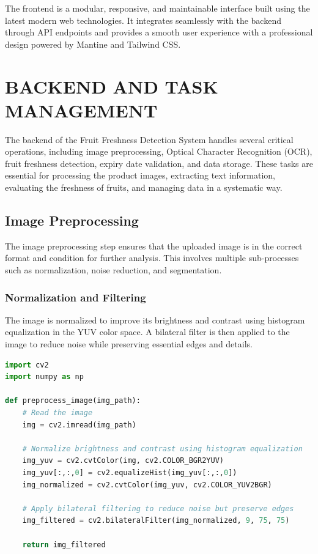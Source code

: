 \documentclass[12pt]{report}
\begin{document}
The frontend is a modular, responsive, and maintainable interface built using the latest modern web technologies. It integrates seamlessly with the backend through API endpoints and provides a smooth user experience with a professional design powered by Mantine and Tailwind CSS.


\section{BACKEND AND TASK MANAGEMENT}
 The backend of the Fruit Freshness Detection System handles several critical operations, including image preprocessing, Optical Character Recognition (OCR), fruit freshness detection, expiry date validation, and data storage. These tasks are essential for processing the product images, extracting text information, evaluating the freshness of fruits, and managing data in a systematic way.

\subsection{Image Preprocessing}
The image preprocessing step ensures that the uploaded image is in the correct format and condition for further analysis. This involves multiple sub-processes such as normalization, noise reduction, and segmentation.

\subsubsection{Normalization and Filtering}
The image is normalized to improve its brightness and contrast using histogram equalization in the YUV color space. A bilateral filter is then applied to the image to reduce noise while preserving essential edges and details.

\begin{lstlisting}[language=Python, caption={Normalization and Filtering Code}]
import cv2
import numpy as np

def preprocess_image(img_path):
    # Read the image
    img = cv2.imread(img_path)
    
    # Normalize brightness and contrast using histogram equalization
    img_yuv = cv2.cvtColor(img, cv2.COLOR_BGR2YUV)
    img_yuv[:,:,0] = cv2.equalizeHist(img_yuv[:,:,0])
    img_normalized = cv2.cvtColor(img_yuv, cv2.COLOR_YUV2BGR)
    
    # Apply bilateral filtering to reduce noise but preserve edges
    img_filtered = cv2.bilateralFilter(img_normalized, 9, 75, 75)
    
    return img_filtered
\end{lstlisting}
\end{document}
